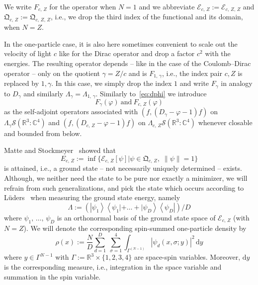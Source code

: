 \documentclass[AHL,Unicode,longabstracts,published]{cedram}
\newcommand*\rd{\mathrm{d}}
\newcommand*\dy{\mathrm{d}y}
\newcommand*\cz{\mathbb{C}}
\newcommand*\rz{\mathbb{R}}
\newcommand*\cE{\mathcal{E}}
\newcommand*\cS{\mathcal{S}}
\newcommand*\gQ{\mathfrak{Q}}
\begin{document}
We write $F_{c,\,Z}$ for the operator when $N=1$ and we abbreviate $\cE_{c,\,Z}:=\cE_{c,\,Z,\,Z}$ and $\gQ_{c,\,Z}:= \gQ_{c,\,Z,\,Z}$, i.e., we drop the third index of the functional and its domain, when $N=Z$.

In the one-particle case, it is also here sometimes convenient to scale out the velocity of light $c$ like for the Dirac operator and drop a factor $c^2$ with the energies. The resulting operator depends -- like in the case of the Coulomb--Dirac operator -- only on the quotient $\gamma=Z/c$ and is $F_{1,\,\gamma}$, i.e., the index pair $c,Z$ is replaced by $1,\gamma$. In this case, we simply drop the index $1$ and write $F_\gamma$ in analogy to $D_\gamma$ and similarly $\Lambda_\gamma=\Lambda_{1,\,\gamma}$. Similarly to~\eqref{eq:dphi} we introduce
\begin{equation}\label{eq:fphi}
F_\gamma(\varphi)\ \text{and}\ F_{c,\,Z}(\varphi)
\end{equation}
as the self-adjoint operators associated with $(f,(D_\gamma-\varphi-1)f)$ on $\Lambda_{\gamma}\cS(\rz^3:\cz^4)$ and $(f,(D_{c,\,Z}-\varphi-1)f)$ on $\Lambda_{c,\,Z}\cS(\rz^3:\cz^4)$ whenever closable and bounded from below.

Matte and Stockmeyer~\cite[Theorem~2.2]{MatteStockmeyer2010} showed that
\begin{equation}\label{gs}
E_{c,\,Z}:=\inf\big\{\cE_{c,\,Z}[\psi]\big| \psi\in\gQ_{c,\,Z},\; \|\psi\|=1\big\}
\end{equation}
is attained, i.e., a ground state -- not necessarily uniquely determined -- exists. Although, we neither need the state to be pure nor exactly a minimizer, we will refrain from such generalizations, and pick the state which occurs according to Lüders~\cite{Luders1951} when measuring the ground state energy, namely
\[
\Lambda:=\left(\left|\psi_1\right\rangle\left\langle\psi_1|+\dots+|\psi_D\right\rangle\left\langle\psi_D\right|\right)/D
\]
where $\psi_1,\,\dots,\,\psi_D$ is an orthonormal basis of the ground state space of $\cE_{c,\,Z}$ (with $N=Z$). We will denote the corresponding spin-summed one-particle density by
\begin{equation}\label{gsd}
\rho(x) := \frac ND \sum_{d=1}^D\;\sum_{\sigma=1}^4\int_{\Gamma^{(N-1)}} \left|\psi_d\left(x,\sigma;y\right)\right|^2\,\dy
\end{equation}
where $y\in\Gamma^{N-1}$ with $\Gamma:=\rz^3\times\{1,2,3,4\}$ are space-spin variables. Moreover, $\rd y$ is the corresponding measure, i.e., integration in the space variable and summation in the spin variable.
\end{document}
